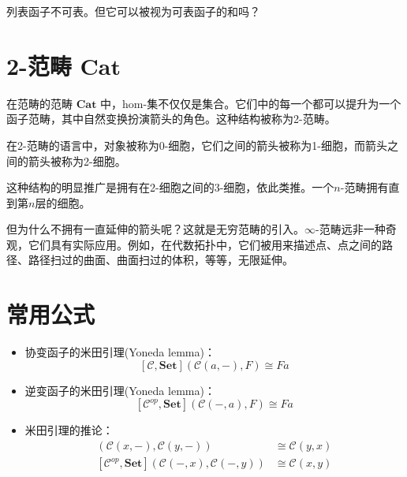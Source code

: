 \documentclass[DaoFP]{subfiles}
\begin{document}
\begin{exercise}
列表函子不可表。但它可以被视为可表函子的和吗？
\end{exercise}

\section{2-范畴 $\mathbf{Cat}$}

在范畴的范畴 $\mathbf{Cat}$ 中，hom-集不仅仅是集合。它们中的每一个都可以提升为一个函子范畴，其中自然变换扮演箭头的角色。这种结构被称为2-范畴。

在2-范畴的语言中，对象被称为0-细胞，它们之间的箭头被称为1-细胞，而箭头之间的箭头被称为2-细胞。

这种结构的明显推广是拥有在2-细胞之间的3-细胞，依此类推。一个$n$-范畴拥有直到第$n$层的细胞。

但为什么不拥有一直延伸的箭头呢？这就是无穷范畴的引入。$\infty$-范畴远非一种奇观，它们具有实际应用。例如，在代数拓扑中，它们被用来描述点、点之间的路径、路径扫过的曲面、曲面扫过的体积，等等，无限延伸。

\section{常用公式}
\begin{itemize}
\item 协变函子的米田引理(Yoneda lemma)：
\[ [\mathcal{C}, \mathbf{Set}]( \mathcal{C}(a, -), F) \cong F a \]
\item 逆变函子的米田引理(Yoneda lemma)：
\[ [\mathcal{C}^{op}, \mathbf{Set}]( \mathcal{C}(-, a), F) \cong F a \]
\item 米田引理的推论：
\begin{align*}
 [\mathcal{C}, \mathbf{Set}]( \mathcal{C}(x, -), \mathcal{C}(y, -)) &\cong \mathcal{C}(y, x) \\
 [\mathcal{C}^{op}, \mathbf{Set}]( \mathcal{C}(-, x), \mathcal{C}(-, y)) &\cong \mathcal{C}(x, y)
\end{align*}

\end{itemize}
\end{document}
